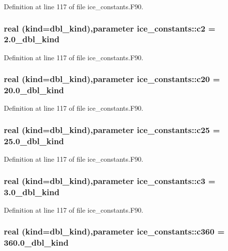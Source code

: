 Definition at line 117 of file ice\_\-constants.F90.\hypertarget{namespaceice__constants_a683e0c28523a17a5d2cd40066167570a}{
\subsubsection[{c2}]{\setlength{\rightskip}{0pt plus 5cm}real (kind=dbl\_\-kind),parameter {\bf ice\_\-constants::c2} = 2.0\_\-dbl\_\-kind}}
\label{namespaceice__constants_a683e0c28523a17a5d2cd40066167570a}


Definition at line 117 of file ice\_\-constants.F90.\hypertarget{namespaceice__constants_a19a6a387f7968c6067c1ff9c1d5f0b45}{
\subsubsection[{c20}]{\setlength{\rightskip}{0pt plus 5cm}real (kind=dbl\_\-kind),parameter {\bf ice\_\-constants::c20} = 20.0\_\-dbl\_\-kind}}
\label{namespaceice__constants_a19a6a387f7968c6067c1ff9c1d5f0b45}


Definition at line 117 of file ice\_\-constants.F90.\hypertarget{namespaceice__constants_a5db59b63c17c3ed647e3cdd61b04793c}{
\subsubsection[{c25}]{\setlength{\rightskip}{0pt plus 5cm}real (kind=dbl\_\-kind),parameter {\bf ice\_\-constants::c25} = 25.0\_\-dbl\_\-kind}}
\label{namespaceice__constants_a5db59b63c17c3ed647e3cdd61b04793c}


Definition at line 117 of file ice\_\-constants.F90.\hypertarget{namespaceice__constants_a0ae384e716bc1243a7bd1c6d1ace209f}{
\subsubsection[{c3}]{\setlength{\rightskip}{0pt plus 5cm}real (kind=dbl\_\-kind),parameter {\bf ice\_\-constants::c3} = 3.0\_\-dbl\_\-kind}}
\label{namespaceice__constants_a0ae384e716bc1243a7bd1c6d1ace209f}


Definition at line 117 of file ice\_\-constants.F90.\hypertarget{namespaceice__constants_a36d55ec278e51e0964603b90df1aa54c}{
\subsubsection[{c360}]{\setlength{\rightskip}{0pt plus 5cm}real (kind=dbl\_\-kind),parameter {\bf ice\_\-constants::c360} = 360.0\_\-dbl\_\-kind}}
\label{namespaceice__constants_a36d55ec278e51e0964603b90df1aa54c}


